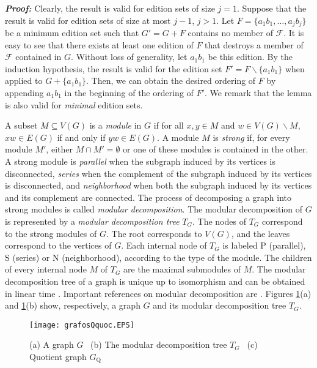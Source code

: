 \documentclass[12pt]{article}
\def\qed{ \fbox \par \medskip }
\def\qed2{ \hfill \framebox[.09in] \par \bigskip }
\begin{document}
\noindent
\emph{\textbf{Proof:}} Clearly, the result is valid for edition sets of size $j=1$. Suppose that the result is valid for edition sets of size at most $j-1$, $j>1$. Let $F=\{a_1b_1, \ldots, a_jb_j\}$ be a minimum edition set such that $G'=G+F$ contains no member of ${\mathscr F}$. It is easy to see that there exists at least one edition of $F$ that destroys a member of ${\mathscr F}$ contained in $G$. Without loss of generality, let $a_1b_1$ be this edition. By the induction hypothesis, the result is valid for the edition set $F'= F \backslash \{a_1b_1\}$ when applied to $G + \{a_1b_1\}$. Then, we can obtain the desired ordering of $F$ by appending $a_1b_1$ in the beginning of the ordering of $F'$. We remark that the lemma is also valid for {\it minimal} edition sets. \qed2


A subset $M \subseteq V(G)$ is a \emph{module} in $G$ if for all
$x, y \in M$  and $w \in V(G) \backslash M$, $xw \in E(G)$ if
and only if $yw \in E(G)$. A module $M$ is \emph{strong} if,
for every module $M'$, either $M \cap M' = \emptyset$ or one of these
modules is contained in the other. A strong module is
\emph{parallel} when the subgraph induced by its vertices is
disconnected, \emph{series} when the complement of the subgraph
induced by its vertices is disconnected, and \emph{neighborhood}
when both the subgraph induced by its vertices and its complement
are connected. The process of decomposing a graph into strong
modules is called \emph{modular decomposition}. The modular
decomposition of $G$ is represented by a \emph{modular
decomposition tree} $T_{G}$. The nodes of $T_{G}$ correspond to the
strong modules of $G$. The root corresponds to $V(G)$, and the
leaves correspond to the vertices of $G$.  Each internal node of
$T_{G}$ is labeled P (parallel), S (series) or N (neighborhood),
according to the type of the module. The children of every
internal node $M$ of $T_{G}$ are the maximal submodules of $M$.
The modular decomposition tree of a graph is unique up to
isomorphism and can be obtained in linear time \cite{MS94}.
Important references on modular decomposition are \cite{BH83,DGC01,G67,HMC2004,MR84,MS94,RJ2000}.
Figures \ref{grafosQquoc}(a) and \ref{grafosQquoc}(b) show,
respectively, a graph $G$ and its modular decomposition tree
$T_G$.

\begin{figure}[htb]
\begin{center}
\texttt{[image: grafosQquoc.EPS]}
\caption{\label{grafosQquoc}(a) A graph $G$ \ (b) The modular
decomposition tree $T_{G}$ \ (c) Quotient graph $G_{\mathrm Q}$}
\end{center}
\end{figure}
\end{document}
